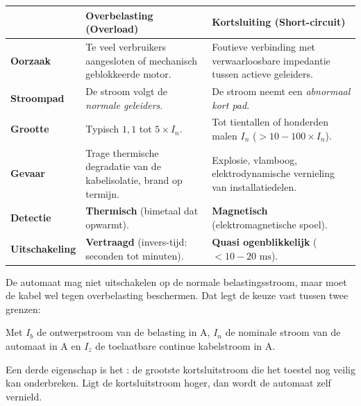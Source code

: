\documentclass[a4paper,11pt]{article}
\begin{document}
\begin{center}
    \begin{tabularx}{\textwidth}{@{}>{\raggedright\arraybackslash}p{26mm} >{\raggedright\arraybackslash}X >{\raggedright\arraybackslash}X @{}}
        \toprule
                               & \textbf{Overbelasting (Overload)}                                   & \textbf{Kortsluiting (Short-circuit)}                                        \\
        \midrule
        \textbf{Oorzaak}       & Te veel verbruikers aangesloten of mechanisch geblokkeerde motor.   & Foutieve verbinding met verwaarloosbare impedantie tussen actieve geleiders. \\[1mm]
        \textbf{Stroompad}     & De stroom volgt de \emph{normale geleiders}.                        & De stroom neemt een \emph{abnormaal kort pad}.                               \\[1mm]
        \textbf{Grootte}       & Typisch $1{,}1$ tot $5 \times I_n$.                                 & Tot tientallen of honderden malen $I_n$ ($>10-100 \times I_n$).              \\[1mm]
        \textbf{Gevaar}        & Trage thermische degradatie van de kabelisolatie, brand op termijn. & Explosie, vlamboog, elektrodynamische vernieling van installatiedelen.       \\[1mm]
        \textbf{Detectie}      & \textbf{Thermisch} (bimetaal dat opwarmt).                          & \textbf{Magnetisch} (elektromagnetische spoel).                              \\[1mm]
        \textbf{Uitschakeling} & \textbf{Vertraagd} (invers-tijd: seconden tot minuten).             & \textbf{Quasi ogenblikkelijk} ($<10-20\text{ ms}$).                          \\
        \bottomrule
    \end{tabularx}
\end{center}

De automaat mag niet uitschakelen op de normale belastingsstroom, maar moet de kabel wel tegen
overbelasting beschermen. Dat legt de keuze vast tussen twee grenzen:

{Met $I_b$ de ontwerpstroom van de belasting in A, $I_n$ de nominale stroom van de automaat in A en
    $I_z$ de toelaatbare continue kabelstroom in A.}

Een derde eigenschap is het : de grootste kortsluitstroom die het
toestel nog veilig kan onderbreken. Ligt de kortsluitstroom hoger, dan wordt de automaat zelf
vernield.
\end{document}
